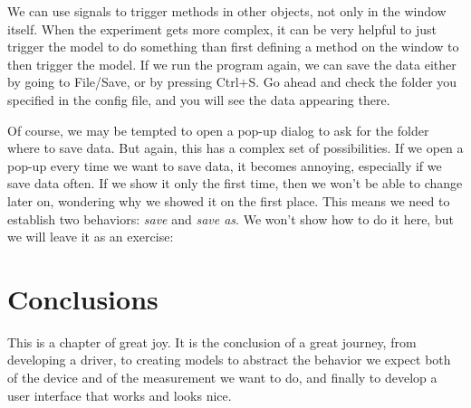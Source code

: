 
We can use signals to trigger methods in other objects, not only in the window itself. When the experiment gets more complex, it can be very helpful to just trigger the model to do something than first defining a method on the window to then trigger the model. If we run the program again, we can save the data either by going to File/Save, or by pressing Ctrl+S. Go ahead and check the folder you specified in the config file, and you will see the data appearing there.


Of course, we may be tempted to open a pop-up dialog to ask for the folder where to save data. But again, this has a complex set of possibilities. If we open a pop-up every time we want to save data, it becomes annoying, especially if we save data often. If we show it only the first time, then we won't be able to change later on, wondering why we showed it on the first place. This means we need to establish two behaviors: \emph{save} and \emph{save as}. We won't show how to do it here, but we will leave it as an exercise:


\section{Conclusions}\label{sec:conclusions}
This is a chapter of great joy. It is the conclusion of a great journey, from developing a driver, to creating models to abstract the behavior we expect both of the device and of the measurement we want to do, and finally to develop a user interface that works and looks nice.

